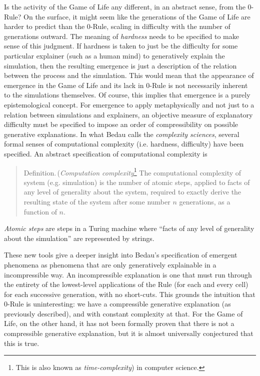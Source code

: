 \documentclass{article}
\newcommand{\ti}[1]{\textit{#1}}
\newcommand{\definition}{{\sc Definition.}\,}
\begin{document}
Is the activity of the Game of Life any different, in an abstract sense, from the 0-Rule? On the surface, it might seem like the generations of the Game of Life are harder to predict than the 0-Rule, scaling in difficulty with the number of generations outward. The meaning of \ti{hardness} needs to be specified to make sense of this judgment. If hardness is taken to just be the difficulty for some particular explainer (such as a human mind) to generatively explain the simulation, then the resulting emergence is just a description of the relation between the process and the simulation. This would mean that the appearance of emergence in the Game of Life and its lack in 0-Rule is not necessarily inherent to the simulations themselves. Of course, this implies that emergence is a purely epistemological concept. For emergence to apply metaphysically and not just to a relation between simulations and explainers, an objective measure of explanatory difficulty must be specified to impose an order of compressibility on possible generative explanations. In what Bedau calls the \ti{complexity sciences}, several formal senses of computational complexity (i.e. hardness, difficulty) have been specified. An abstract specification of computational complexity is

\begin{quote}
\definition (\ti{Computation complexity}\footnote{This is also known as \ti{time-complexity}) in computer science.} The computational complexity of system (e.g. simulation) is the number of atomic steps, applied to facts of any level of generality about the system, required to exactly derive the resulting state of the system after some number $n$ generations, as a function of $n$.
\end{quote}

\ti{Atomic steps} are steps in a Turing machine where ``facts of any level of generality about the simulation'' are represented by strings.

These new tools give a deeper insight into Bedau's specification of emergent phenomena as phenomena that are only generatively explainable in a incompressible way. An incompressible explanation is one that must run through the entirety of the lowest-level applications of the Rule (for each and every cell) for each successive generation, with no short-cuts. This grounds the intuition that 0-Rule is uninteresting: we have a compressible generative explanation (as previously described), and with constant complexity at that. For the Game of Life, on the other hand, it has not been formally proven that there is not a compressible generative explanation, but it is almost universally conjectured that this is true.
\end{document}
